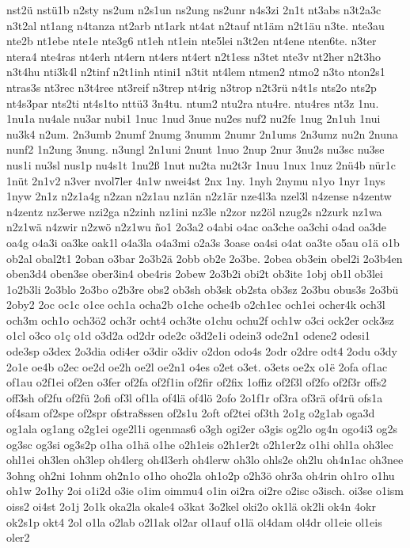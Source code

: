 {nst2ü
nstü1b
n2sty
ns2um
n2s1un
ns2ung
ns2unr
n4s3zi
2n1t
nt3abs
n3t2a3c
n3t2al
nt1ang
n4tanza
nt2arb
nt1ark
nt4at
n2tauf
nt1äm
n2t1äu
n3te.
nte3au
nte2b
nt1ebe
nte1e
nte3g6
nt1eh
nt1ein
nte5lei
n3t2en
nt4ene
nten6te.
n3ter
ntera4
nte4ras
nt4erh
nt4ern
nt4ers
nt4ert
n2t1ess
n3tet
nte3v
nt2her
n2t3ho
n3t4hu
nti3k4l
n2tinf
n2t1inh
ntini1
n3tit
nt4lem
ntmen2
ntmo2
n3to
nton2s1
ntras3s
nt3rec
n3t4ree
nt3reif
n3trep
nt4rig
n3trop
n2t3rü
n4t1s
nts2o
nts2p
nt4s3par
nts2ti
nt4s1to
nttü3
3n4tu.
ntum2
ntu2ra
ntu4re.
ntu4res
nt3z
1nu.
1nu1a
nu4ale
nu3ar
nubi1
1nuc
1nud
3nue
nu2es
nuf2
nu2fe
1nug
2n1uh
1nui
nu3k4
n2um.
2n3umb
2numf
2numg
3numm
2numr
2n1ums
2n3umz
nu2n
2nuna
nunf2
1n2ung
3nung.
n3ungl
2n1uni
2nunt
1nuo
2nup
2nur
3nu2s
nu3sc
nu3se
nus1i
nu3sl
nus1p
nu4s1t
1nu2ß
1nut
nu2ta
nu2t3r
1nuu
1nux
1nuz
2nü4b
nür1c
1nüt
2n1v2
n3ver
nvol7ler
4n1w
nwei4st
2nx
1ny.
1nyh
2nymu
n1yo
1nyr
1nys
1nyw
2n1z
n2z1a4g
n2zan
n2z1au
nz1än
n2z1är
nze4l3a
nzel3l
n4zense
n4zentw
n4zentz
nz3erwe
nzi2ga
n2zinh
nz1ini
nz3le
n2zor
nz2öl
nzug2s
n2zurk
nz1wa
n2z1wä
n4zwir
n2zwö
n2z1wu
ño1
2o3a2
o4abi
o4ac
oa3che
oa3chi
o4ad
oa3de
oa4g
o4a3i
oa3ke
oak1l
o4a3la
o4a3mi
o2a3s
3oase
oa4si
o4at
oa3te
o5au
o1ä
o1b
ob2al
obal2t1
2oban
o3bar
2o3b2ä
2obb
ob2e
2o3be.
2obea
ob3ein
obel2i
2o3b4en
oben3d4
oben3se
ober3in4
obe4ris
2obew
2o3b2i
obi2t
ob3ite
1obj
ob1l
ob3lei
1o2b3li
2o3blo
2o3bo
o2b3re
obs2
ob3sh
ob3sk
ob2sta
ob3sz
2o3bu
obus3s
2o3bü
2oby2
2oc
oc1c
o1ce
och1a
ocha2b
o1che
oche4b
o2ch1ec
och1ei
ocher4k
och3l
och3m
och1o
och3ö2
och3r
ocht4
och3te
o1chu
ochu2f
och1w
o3ci
ock2er
ock3sz
o1cl
o3co
o1ç
o1d
o3d2a
od2dr
ode2c
o3d2e1i
odein3
ode2n1
odene2
odesi1
ode3sp
o3dex
2o3dia
odi4er
o3dir
o3div
o2don
odo4s
2odr
o2dre
odt4
2odu
o3dy
2o1e
oe4b
o2ec
oe2d
oe2h
oe2l
oe2n1
o4es
o2et
o3et.
o3ets
oe2x
o1ë
2ofa
of1ac
of1au
o2f1ei
of2en
o3fer
of2fa
of2f1in
of2fir
of2fix
1offiz
of2f3l
of2fo
of2f3r
offs2
off3sh
of2fu
of2fü
2ofi
of3l
of1la
of4lä
of4lö
2ofo
2o1f1r
of3ra
of3rä
of4rü
ofs1a
of4sam
of2spe
of2spr
ofstra8ssen
of2s1u
2oft
of2tei
of3th
2o1g
o2g1ab
oga3d
og1ala
og1ang
o2g1ei
oge2l1i
ogenmas6
o3gh
ogi2er
o3gis
og2lo
og4n
ogo4i3
og2s
og3sc
og3si
og3s2p
o1ha
o1hä
o1he
o2h1eis
o2h1er2t
o2h1er2z
o1hi
ohl1a
oh3lec
ohl1ei
oh3len
oh3lep
oh4lerg
oh4l3erh
oh4lerw
oh3lo
ohls2e
oh2lu
oh4n1ac
oh3nee
3ohng
oh2ni
1ohnm
oh2n1o
o1ho
oho2la
oh1o2p
o2h3ö
ohr3a
oh4rin
oh1ro
o1hu
oh1w
2o1hy
2oi
o1i2d
o3ie
o1im
oimmu4
o1in
oi2ra
oi2re
o2isc
o3isch.
oi3se
o1ism
oiss2
oi4st
2o1j
2o1k
oka2la
okale4
o3kat
3o2kel
oki2o
ok1lä
ok2li
ok4n
4okr
ok2s1p
okt4
2ol
o1la
o2lab
o2l1ak
ol2ar
ol1auf
o1lä
ol4dam
ol4dr
ol1eie
ol1eis
oler2
}
